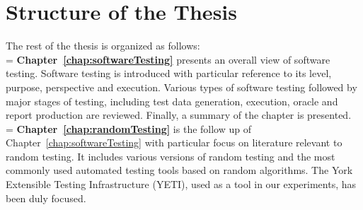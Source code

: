 %



\section{Structure of the Thesis}
The rest of the thesis is organized as follows:\\

\hangindent=\parindent
{}
\noindent
\textbf{Chapter~\ref{chap:softwareTesting}} presents an overall view of software testing. Software testing is introduced with particular reference to its level, purpose, perspective and execution. Various types of software testing followed by major stages of testing, including test data generation, execution, oracle and report production are reviewed. Finally, a summary of the chapter is presented. \\


\hangindent=\parindent
{}
\noindent
\textbf{Chapter~\ref{chap:randomTesting}} is the follow up of Chapter~\ref{chap:softwareTesting} with particular focus on literature relevant to random testing. It includes various versions of random testing and the most commonly used automated testing tools based on random algorithms. The York Extensible Testing Infrastructure (YETI), used as a tool in our experiments, has been duly focused.\\


